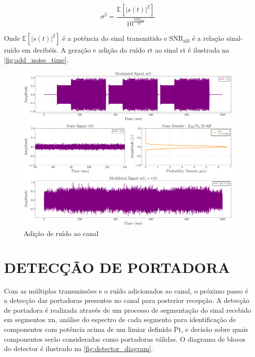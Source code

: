 \begin{equation}
    \sigma^2 = \frac{\mathbb{E}\!\left[ |s(t)|^2 \right]}{10^{\frac{\mathrm{SNR}_{dB}}{10}}}
\end{equation}

\noindent Onde $\mathbb{E}\!\left[ |s(t)|^2 \right]$ é a potência do sinal transmitido e $\mathrm{SNR}_{dB}$ é a relação sinal-ruído em decibéis. A geração e adição do ruído \gls{rt} ao sinal \gls{st} é ilustrada na \autoref{fig:add_noise_time}.

\begin{figure}[H]
	\centering
	\caption{Adição de ruído ao canal}\label{fig:add_noise_time}
	\includegraphics[width=\linewidth]{assets/cap3/example_channel_time_channel.pdf}
\end{figure}

\section{DETECÇÃO DE PORTADORA}\label{sec:detector}

Com as múltiplas transmissões e o ruído adicionados ao canal, o próximo passo é a detecção das portadoras presentes no canal para posterior recepção. A detecção de portadora é realizada através de um processo de segmentação do sinal recebido em segmentos \gls{xn}, análise do espectro de cada segmento para identificação de componentes com potência acima de um limiar definido \gls{Pt}, e decisão sobre quais componentes serão consideradas como portadoras válidas. O diagrama de blocos do detector é ilustrado na \autoref{fig:detector_diagram}.

